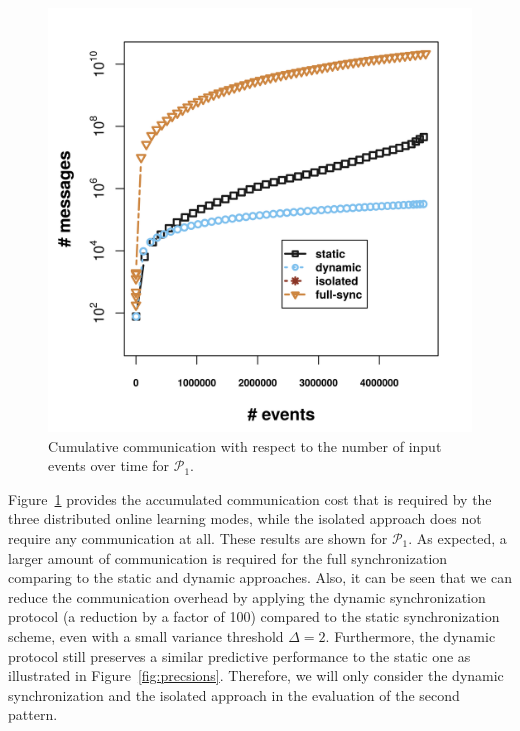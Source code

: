 \begin{center}
	
	\begin{figure}[H]
		\centering
		\includegraphics[width=\textwidth,height=.9\textwidth,keepaspectratio]{chapters/figures/synopses/new/messages_p1.png}
		
		\caption{Cumulative communication with respect to the number of input events over time for $\mathcal{P}_1$.}
		\label{fig:comm}
	\end{figure}
\end{center}

\par Figure~\ref{fig:comm} provides the accumulated communication cost that is required by the three distributed online learning modes, while the isolated approach does not require any communication at all. These results are shown for $\mathcal{P}_1$.  As expected, a larger amount of communication is required for the full synchronization comparing to the static and dynamic approaches. Also, it can be seen that we can reduce the communication overhead by applying the dynamic synchronization protocol (a reduction by a factor of 100) compared to the static synchronization scheme, even with a small variance threshold $\Delta=2$. Furthermore, the dynamic  protocol still preserves a similar predictive performance to the static one as illustrated in Figure~\ref{fig:precsions}.  Therefore, we will only consider the dynamic synchronization and the isolated approach in the evaluation of the second pattern.


